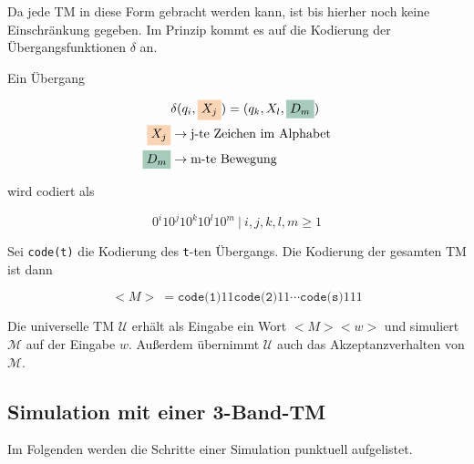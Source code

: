 \documentclass{scrartcl}%
\begin{document}
    \newpage
    Da jede TM in diese Form gebracht werden kann, ist bis hierher noch keine Einschränkung gegeben.
    Im Prinzip kommt es auf die Kodierung der Übergangsfunktionen $\delta$ an.

    Ein Übergang

    \begin{equation*}
        \begin{align}
            &  \delta(q_i,\colorbox{cadmiumorange!35}{$X_j$}) = (q_k,X_l,\colorbox{cadmiumgreen!35}{$D_m$}) \\
            \colorbox{cadmiumorange!35}{$X_j$} &\rightarrow  \text{j-te Zeichen im Alphabet} \\
            \colorbox{cadmiumgreen!35}{$D_m$}& \rightarrow \text{m-te Bewegung} \\
        \end{align}
    \end{equation*}

    wird codiert als

    \begin{equation*}
        0^{i}10^{j}10^{k}10^{l}10^m \ | \ i,j,k,l,m \geq 1
    \end{equation*}

    Sei \texttt{code(t)} die Kodierung des \texttt{t}-ten Übergangs. Die Kodierung der gesamten TM ist dann

    \begin{equation*}
        <M>\ = \texttt{code(1)}11\texttt{code(2)}11 \cdots \texttt{code(s)}111
    \end{equation*}

    Die universelle TM $\mathcal{U}$ erhält als Eingabe ein Wort $<M><w>$ und simuliert $\mathcal{M}$ auf der Eingabe $w$.
    Außerdem übernimmt $\mathcal{U}$ auch das Akzeptanzverhalten von $\mathcal{M}$.

    \subsection*{Simulation mit einer 3-Band-TM}
    Im Folgenden werden die Schritte einer Simulation punktuell aufgelistet.
\end{document}
